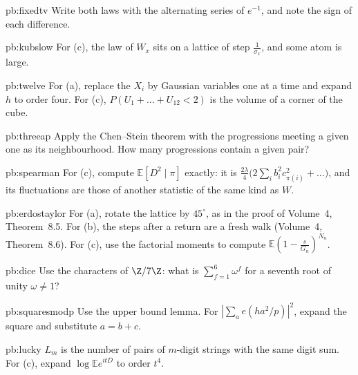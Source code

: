 \begin{hint}{pb:fixedtv}
Write both laws with the alternating series of $e^{-1}$, and note the sign of each difference.
\end{hint}

\begin{hint}{pb:kubslow}
For (c), the law of $W_x$ sits on a lattice of step $\frac1{\sigma_x}$, and some atom is large.
\end{hint}

\begin{hint}{pb:twelve}
For (a), replace the $X_i$ by Gaussian variables one at a time and expand $h$ to order four. For (c), $P(U_1+\dots+U_{12}<2)$ is the volume of a corner of the cube.
\end{hint}

\begin{hint}{pb:threeap}
Apply the Chen--Stein theorem with the progressions meeting a given one as its neighbourhood. How many progressions contain a given pair?
\end{hint}

\begin{hint}{pb:spearman}
For (c), compute $\mathbb E[D^2\mid\pi]$ exactly: it is $\frac{2\lambda}4\bigl(2\sum_ib_i^2c_{\pi(i)}^2+\dots\bigr)$, and its fluctuations are those of another statistic of the
same kind as $W$.
\end{hint}

\begin{hint}{pb:erdostaylor}
For (a), rotate the lattice by $45^\circ$, as in the proof of Volume~4, Theorem~8.5. For (b), the steps after a return are a fresh walk (Volume~4, Theorem~8.6). For (c), use the factorial moments to compute
$\mathbb E(1-\frac s{G_n})^{N_n}$.
\end{hint}

\begin{hint}{pb:dice}
Use the characters of $\Z/7\Z$: what is $\sum_{f=1}^6\omega^{f}$ for a seventh root of unity $\omega\ne1$?
\end{hint}

\begin{hint}{pb:squaresmodp}
Use the upper bound lemma. For $|\sum_a e(ha^2/p)|^2$, expand the square and substitute $a=b+c$.
\end{hint}

\begin{hint}{pb:lucky}
$L_m$ is the number of pairs of $m$-digit strings with the same digit sum. For (c), expand $\log\mathbb Ee^{itD}$ to order $t^4$.
\end{hint}

